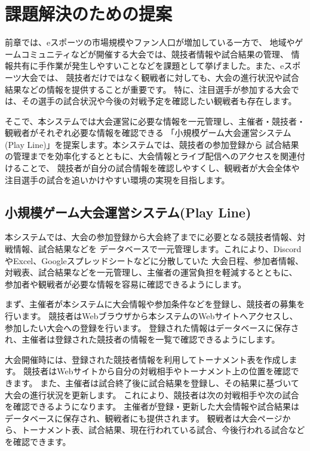 \section{課題解決のための提案}

前章では、eスポーツの市場規模やファン人口が増加している一方で、
地域やゲームコミュニティなどが開催する大会では、競技者情報や試合結果の管理、
情報共有に手作業が発生しやすいことなどを課題として挙げました。また、eスポーツ大会では、
競技者だけではなく観戦者に対しても、大会の進行状況や試合結果などの情報を提供することが重要です。
特に、注目選手が参加する大会では、その選手の試合状況や今後の対戦予定を確認したい観戦者も存在します。

そこで、本システムでは大会運営に必要な情報を一元管理し、主催者・競技者・観戦者がそれぞれ必要な情報を確認できる
「小規模ゲーム大会運営システム(Play Line)」を提案します。本システムでは、競技者の参加登録から
試合結果の管理までを効率化するとともに、大会情報とライブ配信へのアクセスを関連付けることで、
競技者が自分の試合情報を確認しやすくし、観戦者が大会全体や注目選手の試合を追いかけやすい環境の実現を目指します。

\subsection{小規模ゲーム大会運営システム(Play Line)}

本システムでは、大会の参加登録から大会終了までに必要となる競技者情報、対戦情報、試合結果などを
データベースで一元管理します。これにより、DiscordやExcel、Googleスプレッドシートなどに分散していた
大会日程、参加者情報、対戦表、試合結果などを一元管理し、主催者の運営負担を軽減するとともに、
参加者や観戦者が必要な情報を容易に確認できるようにします。

まず、主催者が本システムに大会情報や参加条件などを登録し、競技者の募集を行います。
競技者はWebブラウザから本システムのWebサイトへアクセスし、参加したい大会への登録を行います。
登録された情報はデータベースに保存され、主催者は登録された競技者の情報を一覧で確認できるようにします。

大会開催時には、登録された競技者情報を利用してトーナメント表を作成します。
競技者はWebサイトから自分の対戦相手やトーナメント上の位置を確認できます。
また、主催者は試合終了後に試合結果を登録し、その結果に基づいて大会の進行状況を更新します。
これにより、競技者は次の対戦相手や次の試合を確認できるようになります。
主催者が登録・更新した大会情報や試合結果はデータベースに保存され、観戦者にも提供されます。
観戦者は大会ページから、トーナメント表、試合結果、現在行われている試合、今後行われる試合などを確認できます。

